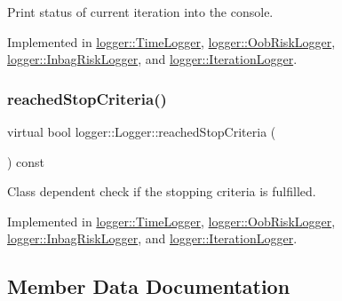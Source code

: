 Print status of current iteration into the console. 



Implemented in \hyperlink{classlogger_1_1_time_logger_ad98f34f3584b2ac448d6a5ef69ee2af1}{logger\+::\+Time\+Logger}, \hyperlink{classlogger_1_1_oob_risk_logger_acab1638b5112232c86c2208b91f649fb}{logger\+::\+Oob\+Risk\+Logger}, \hyperlink{classlogger_1_1_inbag_risk_logger_a040213adf29a645f0fd5356b951627d0}{logger\+::\+Inbag\+Risk\+Logger}, and \hyperlink{classlogger_1_1_iteration_logger_ac3c13bef35391c0408eb196d01b2a286}{logger\+::\+Iteration\+Logger}.

\mbox{\label{classlogger_1_1_logger_aed91421c07062b91cee158ef2bda7ae8}} 
\subsubsection{\texorpdfstring{reached\+Stop\+Criteria()}{reachedStopCriteria()}}
{\footnotesize\ttfamily virtual bool logger\+::\+Logger\+::reached\+Stop\+Criteria (\begin{DoxyParamCaption}{ }\end{DoxyParamCaption}) const\hspace{0.3cm}{\ttfamily [pure virtual]}}



Class dependent check if the stopping criteria is fulfilled. 



Implemented in \hyperlink{classlogger_1_1_time_logger_a380f7e56af17c8a35d729dad1a5e3baa}{logger\+::\+Time\+Logger}, \hyperlink{classlogger_1_1_oob_risk_logger_a5c1c8358ffcb5f5463b43f068ea21aa4}{logger\+::\+Oob\+Risk\+Logger}, \hyperlink{classlogger_1_1_inbag_risk_logger_a17a7416e4cc9db4da3b3eda5012ad7c7}{logger\+::\+Inbag\+Risk\+Logger}, and \hyperlink{classlogger_1_1_iteration_logger_a8b66f0d8d2ddb7f15ca14e2b9150ea80}{logger\+::\+Iteration\+Logger}.



\subsection{Member Data Documentation}
\mbox{\label{classlogger_1_1_logger_a57ca2ab531e0a7ac74f4ecd4b74a938f}} 
